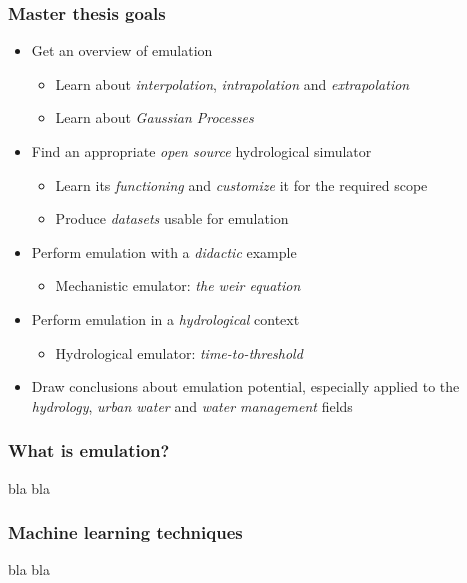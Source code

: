 \documentclass[xcolor=dvipsnames, USenglish]{beamer}  %
\begin{document}
  \begin{frame}
    \frametitle{Master thesis goals}
    \begin{itemize}
      \item Get an overview of emulation
      \begin{itemize}
        \item Learn about \emph{interpolation}, \emph{intrapolation} and \emph{extrapolation}
        \item Learn about \emph{Gaussian Processes}
      \end{itemize}
      \item Find an appropriate \emph{open source} hydrological simulator
      \begin{itemize}
        \item Learn its \emph{functioning} and \emph{customize} it for the required scope
        \item Produce \emph{datasets} usable for emulation
      \end{itemize}
      \item Perform emulation with a \emph{didactic} example
      \begin{itemize}
        \item Mechanistic emulator: \emph{the weir equation}
      \end{itemize}
      \item Perform emulation in a \emph{hydrological} context
      \begin{itemize}
        \item Hydrological emulator: \emph{time-to-threshold}
      \end{itemize}
      \item Draw conclusions about emulation potential, especially applied to the \emph{hydrology},
            \emph{urban water} and \emph{water management} fields
    \end{itemize}
  \end{frame}


  \begin{frame}
    \frametitle{What is emulation?}
    bla bla
  \end{frame}


  \begin{frame}
    \frametitle{Machine learning techniques}
    bla bla
  \end{frame}
\end{document}
